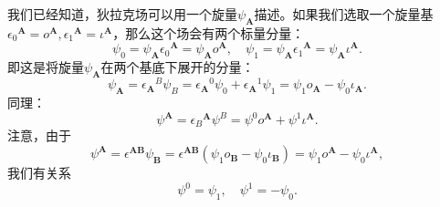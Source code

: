 我们已经知道，狄拉克场可以用一个旋量$\psi _{\boldsymbol{A}}$描述。如果我们选取一个旋量基$\epsilon {_{0}}^{\boldsymbol{A}} =o^{\boldsymbol{A}} ,\epsilon {_{1}}^{\boldsymbol{A}} =\iota ^{\boldsymbol{A}}$，那么这个场会有两个标量分量：
\begin{equation*}
	\psi _{0} =\psi _{\boldsymbol{A}} \epsilon {_{0}}^{\boldsymbol{A}} =\psi _{\boldsymbol{A}} o^{\boldsymbol{A}} ,\quad \psi _{1} =\psi _{\boldsymbol{A}} \epsilon {_{1}}^{\boldsymbol{A}} =\psi _{\boldsymbol{A}} \iota ^{\boldsymbol{A}} .
\end{equation*}
即这是将旋量$\psi _{\boldsymbol{A}}$在两个基底下展开的分量：
\begin{equation*}
	\psi _{\boldsymbol{A}} =\epsilon {_{\boldsymbol{A}}}^{B} \psi _{B} =\epsilon {_{\boldsymbol{A}}}^{0} \psi _{0} +\epsilon {_{\boldsymbol{A}}}^{1} \psi _{1} =\psi _{1} o_{\boldsymbol{A}} -\psi _{0} \iota _{\boldsymbol{A}} .
\end{equation*}
同理：
\begin{equation*}
	\psi ^{\boldsymbol{A}} =\epsilon {_{B}}^{\boldsymbol{A}} \psi ^{B} =\psi ^{0} o^{\boldsymbol{A}} +\psi ^{1} \iota ^{\boldsymbol{A}} .
\end{equation*}
注意，由于
\begin{equation*}
	\psi ^{\boldsymbol{A}} =\epsilon ^{\boldsymbol{AB}} \psi _{\boldsymbol{B}} =\epsilon ^{\boldsymbol{AB}} (\psi _{1} o_{\boldsymbol{B}} -\psi _{0} \iota _{\boldsymbol{B}} )=\psi _{1} o^{\boldsymbol{A}} -\psi _{0} \iota ^{\boldsymbol{A}} ,
\end{equation*}
我们有关系
\begin{equation*}
	\psi ^{0} =\psi _{1} ,\quad \psi ^{1} =-\psi _{0} .
\end{equation*}


